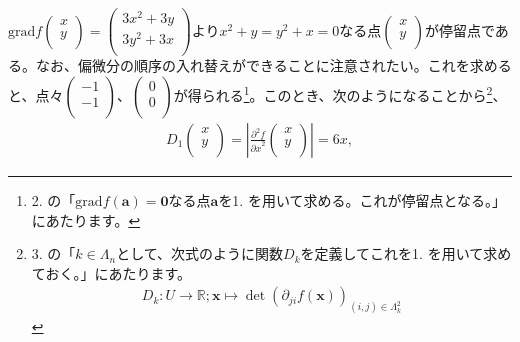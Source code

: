 \documentclass[dvipdfmx]{jsarticle}
\begin{document}
$\mathrm{grad}f\begin{pmatrix}
x \\
y \\
\end{pmatrix} = \begin{pmatrix}
3x^{2} + 3y \\
3y^{2} + 3x \\
\end{pmatrix}$より$x^{2} + y = y^{2} + x = 0$なる点$\begin{pmatrix}
x \\
y \\
\end{pmatrix}$が停留点である。なお、偏微分の順序の入れ替えができることに注意されたい。これを求めると、点々$\begin{pmatrix}
 - 1 \\
 - 1 \\
\end{pmatrix}$、$\begin{pmatrix}
0 \\
0 \\
\end{pmatrix}$が得られる\footnote{2. の「$\mathrm{grad}f\left( \mathbf{a} \right) = \mathbf{0}$なる点$\mathbf{a}$を1. を用いて求める。これが停留点となる。」にあたります。}。このとき、次のようになることから\footnote{3. の「$k \in \varLambda_{n}$として、次式のように関数$D_{k}$を定義してこれを1. を用いて求めておく。」にあたります。
\begin{align*}
D_{k}:U \rightarrow \mathbb{R};\mathbf{x} \mapsto \det\left( \partial_{ji}f\left( \mathbf{x} \right) \right)_{(i,j) \in \varLambda_{k}^{2}}
\end{align*}}、
\begin{align*}
D_{1}\begin{pmatrix}
x \\
y \\
\end{pmatrix} = \left| \frac{\partial^{2}f}{{\partial x}^{2}}\begin{pmatrix}
x \\
y \\
\end{pmatrix} \right| = 6x,
\end{align*}
\end{document}
